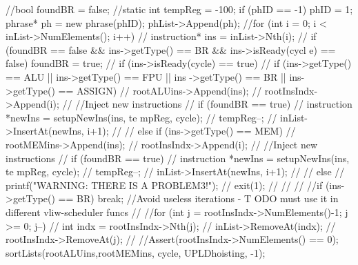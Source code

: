 \begin{DoxyCode}
                                                                                 
                                                                                       
                 {
        //bool foundBR = false;
        //static int tempReg = -100;
        if (phID == -1) {
                phID = 1;
                phrase* ph = new phrase(phID);
                phList->Append(ph);
        }
        //for (int i = 0; i < inList->NumElements(); i++) {
        //      instruction* ins = inList->Nth(i);
        //      if (foundBR == false && ins->getType() == BR && ins->isReady(cycl
      e) == false) {foundBR = true;}
        //      if (ins->isReady(cycle) == true) {
        //              if (ins->getType() == ALU || ins->getType() == FPU || ins
      ->getType() == BR || ins->getType() == ASSIGN) {
        //                      rootALUins->Append(ins);
        //                      rootInsIndx->Append(i);
        //                      //Inject new instructions
        //                      if (foundBR == true) {
        //                              instruction *newIns = setupNewIns(ins, te
      mpReg, cycle);
        //                              tempReg--;
        //                              inList->InsertAt(newIns, i+1);
        //                      }
        //              } else if (ins->getType() == MEM) {
        //                      rootMEMins->Append(ins);
        //                      rootInsIndx->Append(i);
        //                      //Inject new instructions
        //                      if (foundBR == true) {
        //                              instruction *newIns = setupNewIns(ins, te
      mpReg, cycle);
        //                              tempReg--;
        //                              inList->InsertAt(newIns, i+1);
        //                      }
        //              } else {
        //                      printf("WARNING: THERE IS A PROBLEM3!\n");
        //                      exit(1);
        //              }
        //      }
        //      //if (ins->getType() == BR) break; //Avoid useless iterations - T
      ODO must use it in different vliw-scheduler funcs
        //}
        //for (int j = rootInsIndx->NumElements()-1; j >= 0; j--) {
        //      int indx = rootInsIndx->Nth(j);
        //      inList->RemoveAt(indx);
        //      rootInsIndx->RemoveAt(j);
        //}
        //Assert(rootInsIndx->NumElements() == 0);
        sortLists(rootALUins,rootMEMins, cycle, UPLDhoisting, -1);
}
\end{DoxyCode}
